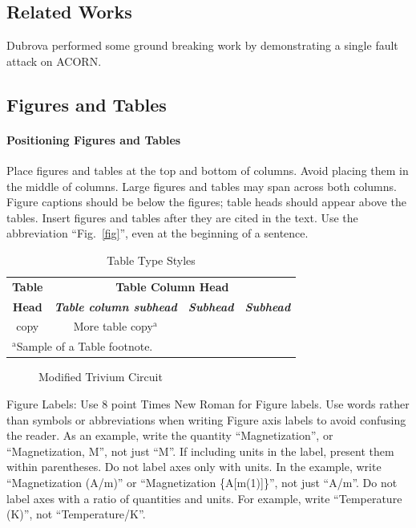 \documentclass[conference]{IEEEtran}
\begin{document}
\subsection{Related Works}
Dubrova performed some ground breaking work by demonstrating a single fault attack on ACORN.



\subsection{Figures and Tables}
\paragraph{Positioning Figures and Tables} Place figures and tables at the top and
bottom of columns. Avoid placing them in the middle of columns. Large
figures and tables may span across both columns. Figure captions should be
below the figures; table heads should appear above the tables. Insert
figures and tables after they are cited in the text. Use the abbreviation
``Fig.~\ref{fig}'', even at the beginning of a sentence.

\begin{table}[htbp]
\caption{Table Type Styles}
\begin{center}
\begin{tabular}{|c|c|c|c|}
\hline
\textbf{Table}&\multicolumn{3}{|c|}{\textbf{Table Column Head}} \\
\cline{2-4}
\textbf{Head} & \textbf{\textit{Table column subhead}}& \textbf{\textit{Subhead}}& \textbf{\textit{Subhead}} \\
\hline
copy& More table copy$^{\mathrm{a}}$& &  \\
\hline
\multicolumn{4}{l}{$^{\mathrm{a}}$Sample of a Table footnote.}
\end{tabular}
\label{tab1}
\end{center}
\end{table}



\begin{figure}[htb]
\centering
\resizebox{0.5\textwidth}{!}{}
\caption{Modified Trivium Circuit}\label{fig:myfigure}
\end{figure}

Figure Labels: Use 8 point Times New Roman for Figure labels. Use words
rather than symbols or abbreviations when writing Figure axis labels to
avoid confusing the reader. As an example, write the quantity
``Magnetization'', or ``Magnetization, M'', not just ``M''. If including
units in the label, present them within parentheses. Do not label axes only
with units. In the example, write ``Magnetization (A/m)'' or ``Magnetization
\{A[m(1)]\}'', not just ``A/m''. Do not label axes with a ratio of
quantities and units. For example, write ``Temperature (K)'', not
``Temperature/K''.
\end{document}
